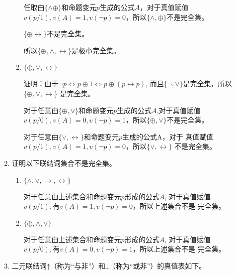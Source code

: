 \documentclass[UTF8]{ctexart}
\begin{document}
\begin{enumerate}
\begin{enumerate}
           任取由$\{\wedge \oplus\}$和命题变元$p$生成的公式$A$，对于真值赋值
           $v(p/1),v(A)=1,v(\neg p)=0$，所以$\{\wedge, \oplus\}$不是完全集。

           $\{\oplus \leftrightarrow\}$不是完全集。

           所以$\{\oplus,\wedge,\leftrightarrow\}$是极小完全集。
           
           \item $\{\oplus, \vee ,  \leftrightarrow \}$
           
           证明：由于$\neg p\Leftrightarrow p\oplus 1\Leftrightarrow p\oplus (p\leftrightarrow p)$,
           而且$\{\neg,\vee \}$是完全集，所以$\{\oplus , \vee ,  \leftrightarrow \}$
           是完全集。

           对于任意由$\{\oplus,\vee\}$和命题变元$p$生成的公式$A$,对于真值赋值
           $v(p/0),v(A)=0,v(\neg p)=1$，所以$\{\oplus,\vee\}$不是完全集。

           对于任意由$\{\vee,\leftrightarrow\}$和命题变元$p$生成的公式A，对于
           真值赋值$v(p/1),v(A)=1,v(\neg p)=0$，所以$\{\vee,\leftrightarrow\}$
           不是完全集。

        
        
        \end{enumerate}
        \item  证明以下联结词集合不是完全集。
        \begin{enumerate}
           \item $\{\wedge, \vee, \rightarrow, \leftrightarrow\}$
           
           对于任意由上述集合和命题变元$p$形成的公式$A$,
           对于真值赋值$v(p/1),有v(A)=1,v(\neg p)=0$，所以上述集合不是
           完全集。
           
           \item $ \{\oplus , \wedge, \vee\}$
           
           对于任意由上述集合和命题变元$p$形成的公式$A$,
           对于真值赋值$v(p/0),有v(A)=0,v(\neg p)=1$，所以上述集合不是
           完全集。
        \end{enumerate}    
        \item 二元联结词­­↑（称为“与非”）和↓（称为“或非”）的真值表如下。
        

\end{enumerate}
\end{document}
